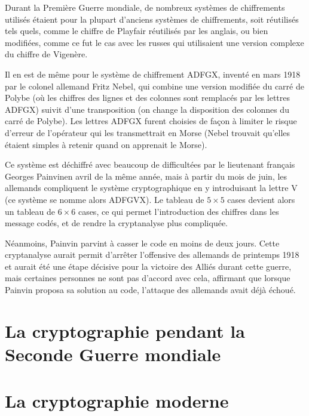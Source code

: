 Durant la Première Guerre mondiale, de nombreux systèmes de
chiffrements utilisés étaient pour la plupart d'anciens systèmes de
chiffrements, soit réutilisés tels quels, comme le chiffre de Playfair
réutilisés par les anglais, ou bien modifiées, comme ce fut le cas
avec les russes qui utilisaient une version complexe du chiffre de
Vigenère.

Il en est de même pour le système de chiffrement ADFGX, inventé en
mars 1918 par le colonel allemand Fritz %
Nebel, qui combine une version modifiée
du carré de Polybe (où les chiffres des
lignes et des colonnes sont remplacés par les lettres ADFGX) suivit d'une
transposition (on change la disposition
des colonnes du carré de Polybe). Les lettres ADFGX furent choisies de
façon à limiter le risque d'erreur de l'opérateur qui les
transmettrait en Morse (Nebel trouvait qu'elles étaient simples à
retenir quand on apprenait le Morse).

Ce système est déchiffré avec beaucoup de difficultées par le
lieutenant français Georges Painvinen avril de la même année, mais à
partir du mois de juin, les allemands compliquent le système
cryptographique en y introduisant la lettre V (ce système se nomme
alors ADFGVX). Le tableau de $5\times 5$ cases devient alors un tableau
de $6\times 6$ cases, ce qui permet l'introduction des chiffres dans
les message codés, et de rendre la cryptanalyse plus
compliquée.

Néanmoins, Painvin parvint à casser le code en moins de
deux jours. Cette cryptanalyse aurait permit d'arrêter l'offensive
des allemands de printemps 1918 et aurait été une étape décisive pour
la victoire des Alliés durant cette guerre, mais certaines personnes
ne sont pas d'accord avec cela, affirmant que lorsque Painvin proposa
sa solution au code, l'attaque des allemands avait déjà échoué. 
\section{La cryptographie pendant la Seconde Guerre mondiale}

\section{La cryptographie moderne}



